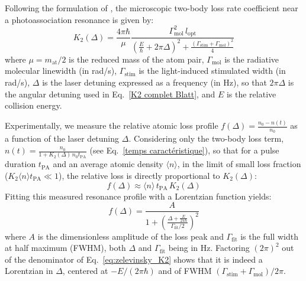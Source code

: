 Following the formulation of \cite{zelevinsky_narrow_2006}, the microscopic
two-body loss rate coefficient near a photoassociation resonance is given by:
\begin{equation}
    K_2(\Delta) = \frac{4\pi\hbar}{\mu} \frac{\Gamma_{\text{mol}}^2 \, l_{\text{opt}}}{\left(\frac{E}{\hbar} + 2\pi\Delta\right)^2 + \frac{(\Gamma_{\text{stim}} + \Gamma_{\text{mol}})^2}{4}}
\label{eq:zelevinsky_K2}
\end{equation}
where $\mu = m_{\text{at}}/2$ is the reduced mass of the atom pair,
$\Gamma_{\text{mol}}$ is the radiative molecular linewidth (in rad/s),
$\Gamma_{\text{stim}}$ is the  light-induced stimulated width (in rad/s), $\Delta$
is the laser detuning expressed as a frequency (in Hz), so that $2\pi\Delta$ is the angular
detuning used in Eq.~\ref{K2 complet Blatt}, and $E$ is the relative collision energy.

Experimentally, we measure the relative atomic loss profile
$f(\Delta) = \frac{n_0 - n(t)}{n_0}$ as a function of the laser detuning $\Delta$.
Considering only the two-body loss term, $n(t) = \frac{n_0}{1+K_2(\Delta)\,n_0 t_{\text{PA}}}$
(see Eq.~\ref{temps caractéristique}), so that for a pulse duration $t_{\text{PA}}$
and an average atomic density $\langle n \rangle$, in the limit of small loss
fraction ($K_2 \langle n \rangle t_{\text{PA}} \ll 1$), the relative loss is
directly proportional to $K_2(\Delta)$:
\begin{equation}
    f(\Delta) \approx \langle n \rangle \, t_{\text{PA}} \, K_2(\Delta)
\end{equation}
Fitting this measured resonance profile with a Lorentzian function yields:
\begin{equation}
    f(\Delta) = \frac{A}{1 + \left( \frac{\Delta + \frac{E}{2\pi\hbar}}{\Gamma_{\text{fit}}/2} \right)^2}
\label{eq:lorentzian_fit_standard}
\end{equation}
where $A$ is the dimensionless amplitude of the loss peak and $\Gamma_{\text{fit}}$
is the full width at half maximum (FWHM), both $\Delta$ and $\Gamma_{\text{fit}}$ being in Hz.
Factoring $(2\pi)^2$ out of the denominator of Eq.~\ref{eq:zelevinsky_K2} shows that it is
indeed a Lorentzian in $\Delta$, centered at $-E/(2\pi\hbar)$ and of FWHM
$(\Gamma_{\text{stim}}+\Gamma_{\text{mol}})/2\pi$.

